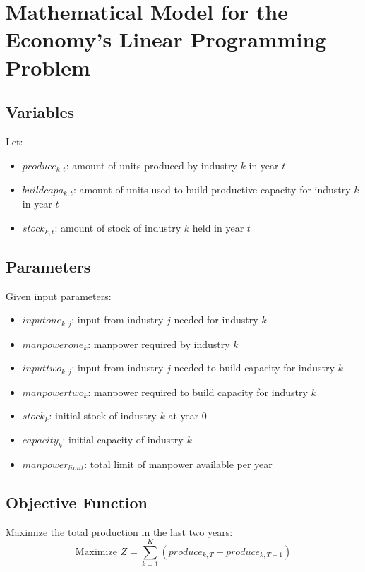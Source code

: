 \documentclass{article}
\begin{document}
\section*{Mathematical Model for the Economy's Linear Programming Problem}

\subsection*{Variables}

Let:
\begin{itemize}
    \item \( produce_{k,t} \): amount of units produced by industry \( k \) in year \( t \)
    \item \( buildcapa_{k,t} \): amount of units used to build productive capacity for industry \( k \) in year \( t \)
    \item \( stock_{k,t} \): amount of stock of industry \( k \) held in year \( t \)
\end{itemize}

\subsection*{Parameters}

Given input parameters:
\begin{itemize}
    \item \( inputone_{k,j} \): input from industry \( j \) needed for industry \( k \)
    \item \( manpowerone_{k} \): manpower required by industry \( k \)
    \item \( inputtwo_{k,j} \): input from industry \( j \) needed to build capacity for industry \( k \)
    \item \( manpowertwo_{k} \): manpower required to build capacity for industry \( k \)
    \item \( stock_{k} \): initial stock of industry \( k \) at year 0
    \item \( capacity_{k} \): initial capacity of industry \( k \)
    \item \( manpower_{limit} \): total limit of manpower available per year
\end{itemize}

\subsection*{Objective Function}

Maximize the total production in the last two years:
\[
\text{Maximize } Z = \sum_{k=1}^{K} (produce_{k,T} + produce_{k,T-1})
\]
\end{document}
